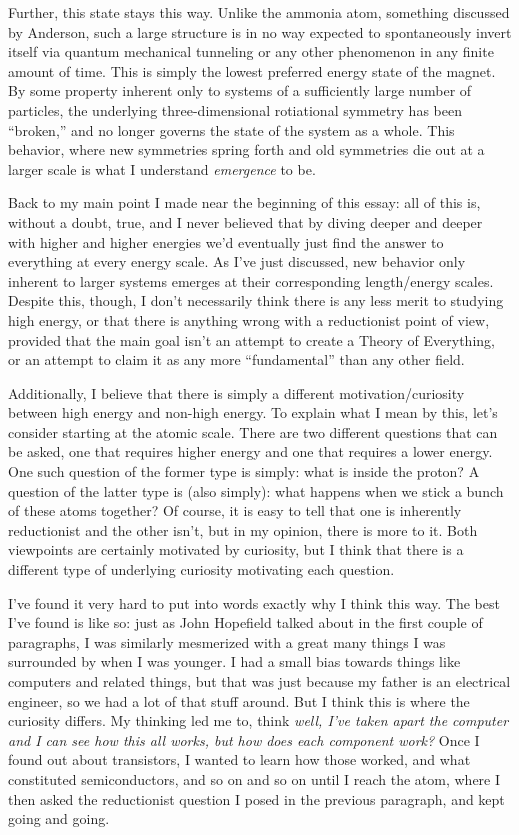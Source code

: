 Further, this state stays this way. Unlike the ammonia atom, something discussed by Anderson, such a large structure is in no way expected to spontaneously invert itself via quantum mechanical tunneling or any other phenomenon in any finite amount of time. This is simply the lowest preferred energy state of the magnet. By some property inherent only to systems of a sufficiently large number of particles, the underlying three-dimensional rotiational symmetry has been ``broken,'' and no longer governs the state of the system as a whole. This behavior, where new symmetries spring forth and old symmetries die out at a larger scale is what I understand \textit{emergence} to be.

Back to my main point I made near the beginning of this essay: all of this is, without a doubt, true, and I never believed that by diving deeper and deeper with higher and higher energies we'd eventually just find the answer to everything at every energy scale. As I've just discussed, new behavior only inherent to larger systems emerges at their corresponding length/energy scales. Despite this, though, I don't necessarily think there is any less merit to studying high energy, or that there is anything wrong with a reductionist point of view, provided that the main goal isn't an attempt to create a Theory of Everything, or an attempt to claim it as any more ``fundamental'' than any other field.

Additionally, I believe that there is simply a different motivation/curiosity between high energy and non-high energy. To explain what I mean by this, let's consider starting at the atomic scale. There are two different questions that can be asked, one that requires higher energy and one that requires a lower energy. One such question of the former type is simply: what is inside the proton? A question of the latter type is (also simply): what happens when we stick a bunch of these atoms together? Of course, it is easy to tell that one is inherently reductionist and the other isn't, but in my opinion, there is more to it. Both viewpoints are certainly motivated by curiosity, but I think that there is a different type of underlying curiosity motivating each question.

I've found it very hard to put into words exactly why I think this way. The best I've found is like so: just as John Hopefield talked about in the first couple of paragraphs, I was similarly mesmerized with a great many things I was surrounded by when I was younger. I had a small bias towards things like computers and related things, but that was just because my father is an electrical engineer, so we had a lot of that stuff around. But I think this is where the curiosity differs. My thinking led me to, think \textit{well, I've taken apart the computer and I can see how this all works, but how does each component work?} Once I found out about transistors, I wanted to learn how those worked, and what constituted semiconductors, and so on and so on until I reach the atom, where I then asked the reductionist question I posed in the previous paragraph, and kept going and going.

